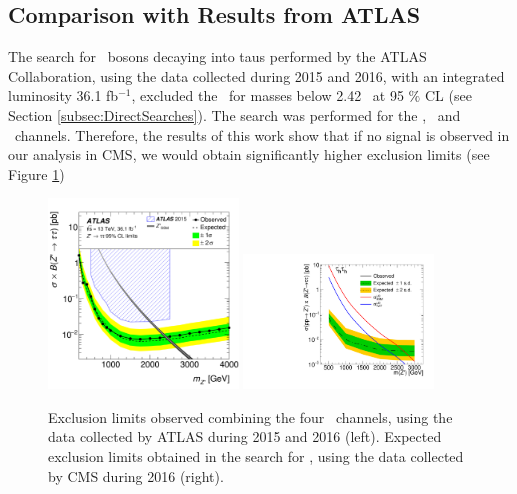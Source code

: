 \subsection{Comparison with Results from ATLAS}
\label{ATLAS}

The search for \Zprime~bosons decaying into taus performed by the ATLAS Collaboration,
using the data collected during 2015 and 2016, with an integrated luminosity 36.1 fb$^{-1}$, 
excluded the \ZprimeSSM~for masses below 2.42 \TeV~at 95 $\%$ CL (see Section \ref{subsec:DirectSearches}). The search 
was performed for the \tauh\tauh, \tauh\taumu~and \tauh\taue~channels. Therefore, the results of this work show
that if no signal is observed in our analysis in CMS, we would obtain significantly higher exclusion 
limits (see Figure \ref{fig:ComparisonATLAS})

\begin{figure}[ht]
 \begin{center}
 \captionsetup[subfloat]{farskip=0pt,captionskip=0.0cm,labelformat=empty}
  \includegraphics[clip,width=0.45\textwidth]{figuras/Chapter1/ATLASZprime2ditaufigure}
  \includegraphics[clip,width=0.45\textwidth]{figuras/Conclusions/tt_Limits.pdf}
 \end{center}
 \caption{Exclusion limits observed combining the four \Zprimetotautau~channels, using the data collected by ATLAS during 2015 and 2016 (left). 
 Expected exclusion limits obtained in the search for \Zprimetotauh, using the data collected by CMS during 2016 (right).}
 \label{fig:ComparisonATLAS}
 \end{figure}

